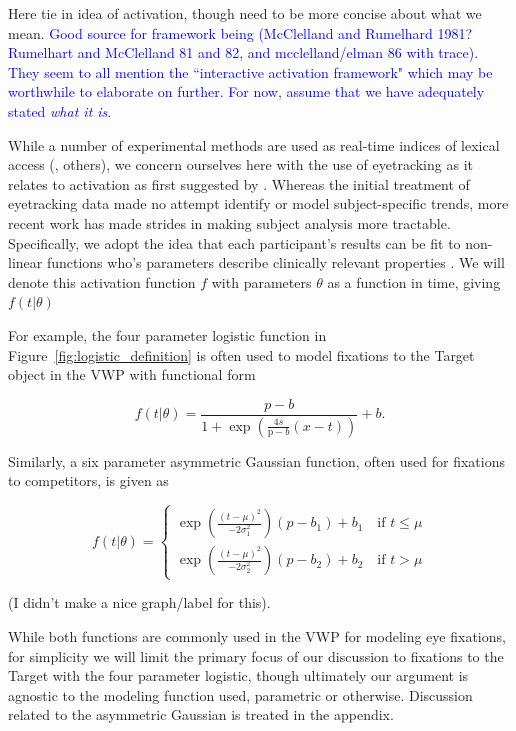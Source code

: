 \documentclass{article}
\providecommand{\cn}[1]{\textcolor{blue}{#1}}
\begin{document}
Here tie in idea of activation, though need to be more concise about what we mean. \cn{Good source for framework being (McClelland and Rumelhard 1981? Rumelhart and McClelland 81 and 82, and mcclelland/elman 86 with trace). They seem to all mention the ``interactive activation framework" which may be worthwhile to elaborate on further. For now, assume that we have adequately stated \textit{what it is}.}

While a number of experimental methods are used as real-time indices of lexical access (\cite{Spivey2005}, others), we concern ourselves here with the use of eyetracking as it relates to activation as first suggested by \cite{allopenna1998tracking}. Whereas the initial treatment of eyetracking data made no attempt identify or model subject-specific trends, more recent work has made strides in making subject analysis more tractable. Specifically, we adopt the idea that each participant's results can be fit to non-linear functions who's parameters describe clinically relevant properties \cite{mcmurray2010individual}. We will denote this activation function $f$ with parameters $\theta$ as a function in time, giving $f(t|\theta)$

For example, the four parameter logistic function in Figure~\ref{fig:logistic_definition} is often used to model fixations to the Target object in the VWP with functional form

\begin{equation} \label{eq:logistic}
f(t|\theta) = \frac{p-b}{1 + \exp \left(\frac{4s}{\text{p}-b} (x - t) \right)} + b.
\end{equation}

Similarly, a six parameter asymmetric Gaussian function, often used for fixations to competitors, is given as

\begin{equation} \label{eq:dg}
f(t|\theta) = \begin{cases}
\exp \left( \frac{(t - \mu)^2}{-2\sigma_1^2} \right) (p - b_1) + b_1 \quad \text{if } t \leq \mu \\
\exp \left( \frac{(t - \mu)^2}{-2\sigma_2^2} \right) (p - b_2) + b_2 \quad \text{if } t > \mu
\end{cases}
\end{equation}

(I didn't make a nice graph/label for this). 

While both functions are commonly used in the VWP for modeling eye fixations, for simplicity we will limit the primary focus of our discussion to fixations to the Target with the four parameter logistic, though ultimately our argument is agnostic to the modeling function used, parametric or otherwise. Discussion related to the asymmetric Gaussian is treated in the appendix.
\end{document}
